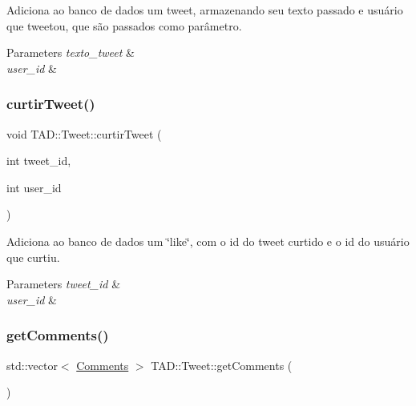 Adiciona ao banco de dados um tweet, armazenando seu texto passado e usuário que tweetou, que são passados como parâmetro. 


\begin{DoxyParams}{Parameters}
{\em texto\+\_\+tweet} & \\
\hline
{\em user\+\_\+id} & \\
\hline
\end{DoxyParams}
\mbox{\label{class_t_a_d_1_1_tweet_a3c877225ed50649b8513fffa8ed2af39}} 
\subsubsection{\texorpdfstring{curtir\+Tweet()}{curtirTweet()}}
{\footnotesize\ttfamily void T\+A\+D\+::\+Tweet\+::curtir\+Tweet (\begin{DoxyParamCaption}\item[{int}]{tweet\+\_\+id,  }\item[{int}]{user\+\_\+id }\end{DoxyParamCaption})}



Adiciona ao banco de dados um \char`\"{}like\char`\"{}, com o id do tweet curtido e o id do usuário que curtiu. 


\begin{DoxyParams}{Parameters}
{\em tweet\+\_\+id} & \\
\hline
{\em user\+\_\+id} & \\
\hline
\end{DoxyParams}
\mbox{\label{class_t_a_d_1_1_tweet_a20ab9183171e77face3cdd0bfd1e1197}} 
\subsubsection{\texorpdfstring{get\+Comments()}{getComments()}}
{\footnotesize\ttfamily std\+::vector$<$ \hyperlink{class_t_a_d_1_1_comments}{Comments} $>$ T\+A\+D\+::\+Tweet\+::get\+Comments (\begin{DoxyParamCaption}{ }\end{DoxyParamCaption})}

